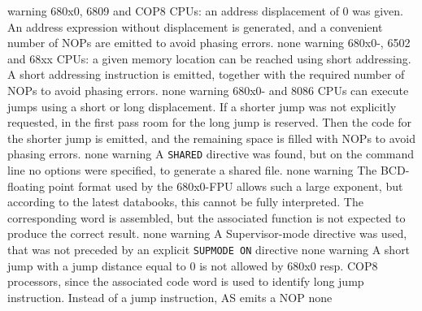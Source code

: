 \documentclass[12pt,twoside]{report}
\newcommand{\tty}[1]{{\tt #1}}
\newcommand{\asname}{{AS}}
\begin{document}
\begin{description}
               {warning}
               {680x0, 6809 and COP8 CPUs: an address displacement of 0 was
                given.  An address expression without displacement is
                generated, and a convenient number of NOPs are emitted
                to avoid phasing errors.}
               {none}
               {warning}
               {680x0-, 6502 and 68xx CPUs: a given memory location can be
                reached using short addressing. A short addressing
                instruction is emitted, together with the required
                number of NOPs to avoid phasing errors.}
               {none}
               {warning}
               {680x0- and 8086 CPUs can execute jumps using a short or long
                displacement. If a shorter jump was not explicitly
                requested, in the
                first pass room for the long jump is reserved. Then the code
                for the shorter jump is emitted, and the remaining space is
                filled with NOPs to avoid phasing errors.}
               {none}
               {warning}
               {A \tty{SHARED} directive was found, but on the command line no
                options were specified, to generate a shared file.}
               {none}
               {warning}
               {The BCD-floating point format used by the 680x0-FPU
                allows such a large exponent, but according to the latest
                databooks, this cannot be fully interpreted. The
                corresponding word is assembled, but the associated
                function is not expected to produce the correct result.}
               {none}
               {warning}
               {A Supervisor-mode directive was used, that was not preceded
                by an explicit \tty{SUPMODE ON} directive}
               {none}
               {warning}
               {A short jump with a jump distance equal to 0 is not allowed
                by 680x0 resp. COP8 processors, since the associated code word is
                used to identify long jump instruction. Instead of a
                jump instruction, \asname{} emits a NOP}
               {none}

\end{description}
\end{document}
